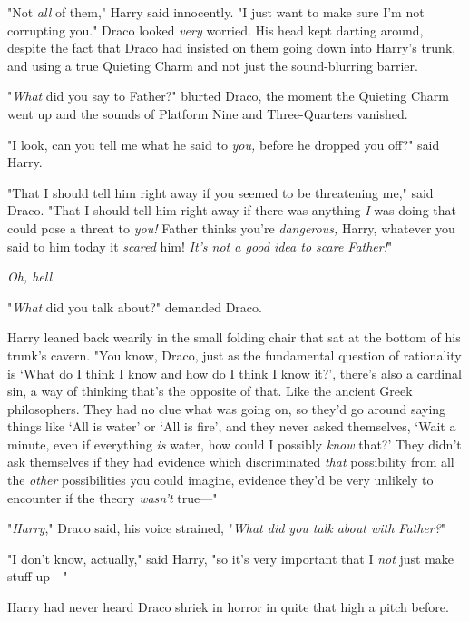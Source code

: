 "Not \emph{all} of them," Harry said innocently. "I just want to make sure I'm
not corrupting you."
\sbreak
Draco looked \emph{very} worried. His head kept darting around, despite the
fact that Draco had insisted on them going down into Harry's trunk, and using a
true Quieting Charm and not just the sound-blurring barrier.

"\emph{What} did you say to Father?" blurted Draco, the moment the Quieting
Charm went up and the sounds of Platform Nine and Three-Quarters vanished.

"I{\el} look, can you tell me what he said to \emph{you,} before he dropped
you off?" said Harry.

"That I should tell him right away if you seemed to be threatening me," said
Draco. "That I should tell him right away if there was anything \emph{I} was
doing that could pose a threat to \emph{you!} Father thinks you're
\emph{dangerous,} Harry, whatever you said to him today it \emph{scared} him!
\emph{It's not a good idea to scare Father!}"

\emph{Oh, hell{\el}}

"\emph{What} did you talk about?" demanded Draco.

Harry leaned back wearily in the small folding chair that sat at the bottom of
his trunk's cavern. "You know, Draco, just as the fundamental question of
rationality is `What do I think I know and how do I think I know it?', there's
also a cardinal sin, a way of thinking that's the opposite of that. Like the
ancient Greek philosophers. They had no clue what was going on, so they'd go
around saying things like `All is water' or `All is fire', and they never asked
themselves, `Wait a minute, even if everything \emph{is} water, how could I
possibly \emph{know} that?' They didn't ask themselves if they had evidence
which discriminated \emph{that} possibility from all the \emph{other}
possibilities you could imagine, evidence they'd be very unlikely to encounter
if the theory \emph{wasn't} true---"

"\emph{Harry}," Draco said, his voice strained, "\emph{What did you talk about
with Father?}"

"I don't know, actually," said Harry, "so it's very important that I \emph{not}
just make stuff up---"

Harry had never heard Draco shriek in horror in quite that high a pitch before.
